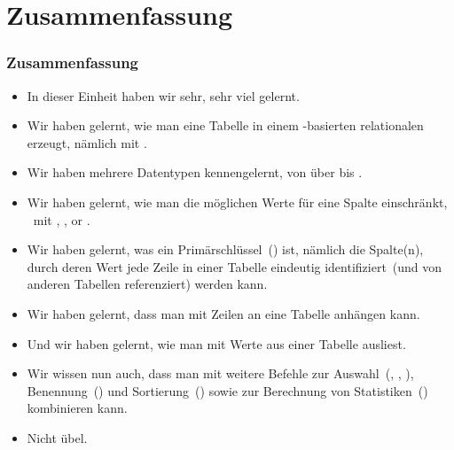 \documentclass[aspectratio=169,mathserif,notheorems]{beamer}%
\begin{document}
\section{Zusammenfassung}%
%
\begin{frame}%
\frametitle{Zusammenfassung}%
\begin{itemize}%
\item In dieser Einheit haben wir sehr, sehr viel gelernt.%
\item<2-> Wir haben gelernt, wie man eine Tabelle in einem -basierten relationalen  erzeugt, nämlich mit .%
\item<3-> Wir haben mehrere Datentypen kennengelernt, von  über  bis .%
\item<4-> Wir haben gelernt, wie man die möglichen Werte für eine Spalte einschränkt, \DEzB~mit , , or .%
\item<5-> Wir haben gelernt, was ein Primärschlüssel~() ist, nämlich die Spalte(n), durch deren Wert jede Zeile in einer Tabelle eindeutig identifiziert~(und von anderen Tabellen referenziert) werden kann.%
\item<5-> Wir haben gelernt, dass man mit  Zeilen an eine Tabelle anhängen kann.%
\item<6-> Und wir haben gelernt, wie man mit  Werte aus einer Tabelle ausliest.%
\item<7-> Wir wissen nun auch, dass man  mit weitere Befehle zur Auswahl~(, , ), Benennung~() und Sortierung~() sowie zur Berechnung von Statistiken~() kombinieren kann.%
\item<8-> Nicht übel.%
\end{itemize}%
\end{frame}%
%
\endPresentation%
\end{document}
